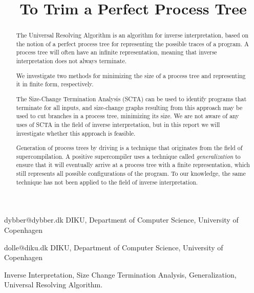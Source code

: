 \documentclass[10pt]{../sigplanconf}
\begin{document}

\title{To Trim a Perfect Process Tree}

           {dybber@dybber.dk}
           {DIKU, Department of Computer Science, University of Copenhagen}

           {dolle@diku.dk}
           {DIKU, Department of Computer Science, University of Copenhagen}

\authorpermission
{}

\maketitle


\begin{abstract}
  The Universal Resolving Algorithm\cite{abramov2000universal} is an
  algorithm for inverse interpretation, based on the notion of a
  perfect process tree for representing the possible traces of a
  program. A process tree will often have an infinite representation,
  meaning that inverse interpretation does not always terminate.

  We investigate two methods for minimizing the size of a process tree
  and representing it in finite form, respectively.

  The Size-Change Termination Analysis (SCTA)\cite{lee2001size} can be
  used to identify programs that terminate for all inputs, and
  size-change graphs resulting from this approach may be used to cut
  branches in a process tree, minimizing its size. We are not aware of
  any uses of SCTA in the field of inverse interpretation, but in this
  report we will investigate whether this approach is feasible.

  Generation of process trees by driving is a technique that
  originates from the field of
  supercompilation\cite{sorensen1998introduction}. A positive
  supercompiler uses a technique called \emph{generalization} to
  ensure that it will eventually arrive at a process tree with a
  finite representation, which still represents all possible
  configurations of the program. To our knowledge, the same technique
  has not been applied to the field of inverse interpretation.
\end{abstract}

\keywords Inverse Interpretation, Size Change Termination Analysis,
Generalization, Universal Resolving Algorithm.
\end{document}
